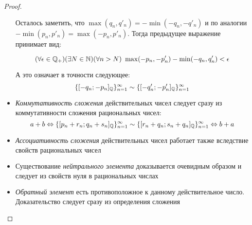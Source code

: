 \begin{proof}
\begin{itemize}
            Осталось заметить, что $\max(q_n, q'_n) = - \min(-q_n, -q'_n)$
            и по аналогии $- \min(p_n, p'_n) = \max(-p_n, p'_n)$.
            Тогда предыдущее выражение принимает вид:

            \[
                (\forall \epsilon \in \mathbb{Q}_+)(\exists N \in \mathbb{N})
                (\forall n > N)\ \max(-p_n, -p'_n) - \min(-q_n, q'_n)
                < \epsilon
            \]

            А это означает в точности следующее:
            \[
                \{[-q_n; -p_n]_{\mathbb{Q}}\}_{n = 1}^\infty \sim
                \{[-q'_n; -p'_n]_{\mathbb{Q}}\}_{n = 1}^\infty
            \]
        \item \textit{Коммутативность сложения} действительных чисел
            следует сразу из коммутативности сложения рациональных
            чисел:
            \[
                a + b \Leftrightarrow \{[p_n + r_n; q_n + s_n]_{\mathbb{Q}}\}_{n = 1}^\infty
                \sim
                \{[r_n + q_n; s_n + q_n]_{\mathbb{Q}}\}_{n = 1}^\infty \Leftrightarrow b + a
            \]
        \item \textit{Ассоциативность сложения} действительных
            чисел работает также вследствие свойств рациональных чисел
        \item Существование \textit{нейтрального элемента} доказывается
            очевидным образом и следует из свойств нуля в
            рациональных числах
        \item \textit{Обратный элемент} есть противоположное к
            данному действительное число. Доказательство
            следует сразу из определения сложения
    \end{itemize}
\end{proof}